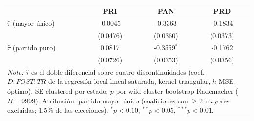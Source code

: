 \begin{tabular}{lccc}
\toprule
 & PRI & PAN & PRD \\
\midrule
$\hat{\tau}$ (mayor único) & -0.0045 & -0.3363 & -0.1834 \\
 & (0.0476) & (0.0360) & (0.0373) \\
\midrule
$\hat{\tau}$ (partido puro) & 0.0817 & -0.3559$^{*}$ & -0.1762 \\
 & (0.0726) & (0.0353) & (0.0356) \\
\bottomrule
\multicolumn{4}{p{0.9\textwidth}}{\footnotesize \textit{Nota:} $\hat{\tau}$ es el doble
  diferencial sobre cuatro discontinuidades (coef.\ $D{:}POST{:}TR$ de la regresión
  local-lineal saturada, kernel triangular, $h$ MSE-óptimo). SE clustered por estado;
  $p$ por wild cluster bootstrap Rademacher ($B=9999$). Atribución: partido mayor único
  (coaliciones con $\ge 2$ mayores excluidas; 1.5\% de las elecciones). $^{*}p<0.10$,
  $^{**}p<0.05$, $^{***}p<0.01$.}
\end{tabular}
